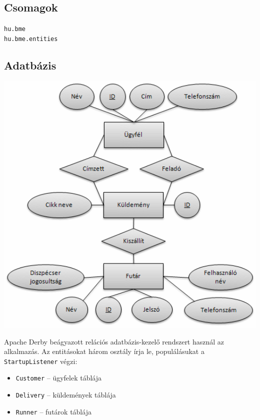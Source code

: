 \documentclass[a4paper,oneside,12pt]{article}
\begin{document}
\subsection{Csomagok}
\verb+hu.bme+\\
\verb+hu.bme.entities+
\subsection{Adatbázis}
\begin{center}
        \includegraphics[width=14cm]{er.PNG}
        \label{fig:ntier}
\end{center}
Apache Derby beágyazott relációs adatbázis-kezelő rendszert használ az alkalmazás.
Az entitásokat három osztály írja le, populálásukat a \verb+StartupListener+ végzi:
\begin{itemize}
	\item \verb+Customer+ -- ügyfelek táblája
	\item \verb+Delivery+ -- küldemények táblája
	\item \verb+Runner+ -- futárok táblája
\end{itemize}
\end{document}
